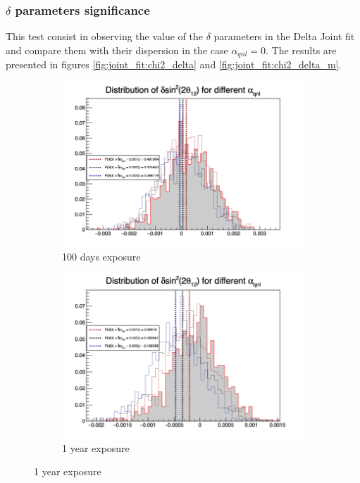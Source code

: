 \documentclass[../main.tex]{subfiles}
\begin{document}
\subsubsection{$\delta$ parameters significance}

This test consist in observing the value of the $\delta$ parameters in the Delta Joint fit and compare them with their dispersion in the case $\alpha_{qnl} = 0$. The results are presented in figures \ref{fig:joint_fit:chi2_delta} and \ref{fig:joint_fit:chi2_delta_m}.

\begin{figure}[th]
  \centering
  \begin{subfigure}[t]{0.48\linewidth}
    \includegraphics[width=\linewidth]{images/joint_fit/stat_tests/chi2_delta_100d.png}
    \caption{100 days exposure}
  \end{subfigure}
  \begin{subfigure}[t]{0.48\linewidth}
    \includegraphics[width=\linewidth]{images/joint_fit/stat_tests/chi2_delta_1y.png}
    \caption{1 year exposure}
  \end{subfigure}



\end{figure}
\end{document}
